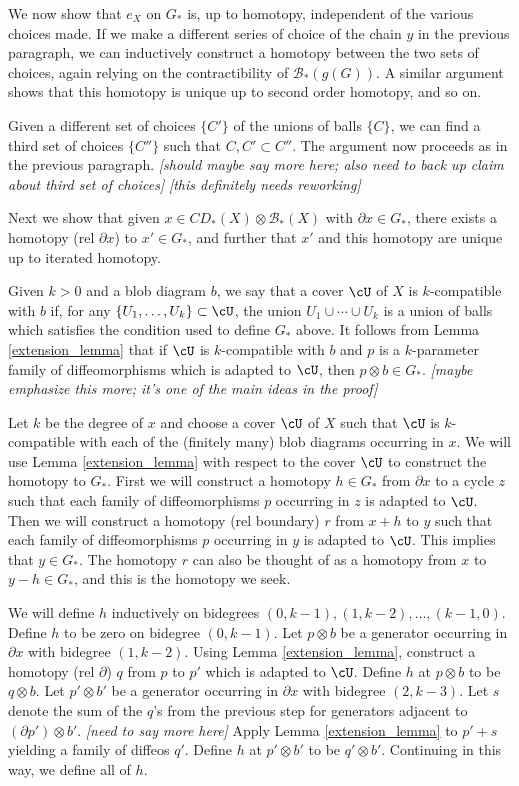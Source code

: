 \documentclass[11pt,leqno]{amsart}
\def\bc{{\mathcal B}}
\def\bd{\partial}
\def\sub{\subset}
\def\nn#1{{{\it \small [#1]}}}
\begin{document}
We now show that $e_X$ on $G_*$ is, up to homotopy, independent of the various choices made.
If we make a different series of choice of the chain $y$ in the previous paragraph,
we can inductively construct a homotopy between the two sets of choices,
again relying on the contractibility of $\bc_*(g(G))$.
A similar argument shows that this homotopy is unique up to second order homotopy, and so on.

Given a different set of choices $\{C'\}$ of the unions of balls $\{C\}$,
we can find a third set of choices $\{C''\}$ such that $C, C' \sub C''$.
The argument now proceeds as in the previous paragraph.
\nn{should maybe say more here; also need to back up claim about third set of choices}
\nn{this definitely needs reworking}

Next we show that given $x \in CD_*(X) \otimes \bc_*(X)$ with $\bd x \in G_*$, there exists
a homotopy (rel $\bd x$) to $x' \in G_*$, and further that $x'$ and
this homotopy are unique up to iterated homotopy.

Given $k>0$ and a blob diagram $b$, we say that a cover $\cU$ of $X$ is $k$-compatible with
$b$ if, for any $\{U_1, \ldots, U_k\} \sub \cU$, the union
$U_1\cup\cdots\cup U_k$ is a union of balls which satisfies the condition used to define $G_*$ above.
It follows from Lemma \ref{extension_lemma}
that if $\cU$ is $k$-compatible with $b$ and
$p$ is a $k$-parameter family of diffeomorphisms which is adapted to $\cU$, then
$p\otimes b \in G_*$.
\nn{maybe emphasize this more; it's one of the main ideas in the proof}

Let $k$ be the degree of $x$ and choose a cover $\cU$ of $X$ such that $\cU$ is
$k$-compatible with each of the (finitely many) blob diagrams occurring in $x$.
We will use Lemma \ref{extension_lemma} with respect to the cover $\cU$ to
construct the homotopy to $G_*$.
First we will construct a homotopy $h \in G_*$ from $\bd x$ to a cycle $z$ such that
each family of diffeomorphisms $p$ occurring in $z$ is adapted to $\cU$.
Then we will construct a homotopy (rel boundary) $r$ from $x + h$ to $y$ such that
each family of diffeomorphisms $p$ occurring in $y$ is adapted to $\cU$.
This implies that $y \in G_*$.
The homotopy $r$ can also be thought of as a homotopy from $x$ to $y-h \in G_*$, and this is the homotopy we seek.

We will define $h$ inductively on bidegrees $(0, k-1), (1, k-2), \ldots, (k-1, 0)$.
Define $h$ to be zero on bidegree $(0, k-1)$.
Let $p\otimes b$ be a generator occurring in $\bd x$ with bidegree $(1, k-2)$.
Using Lemma \ref{extension_lemma}, construct a homotopy (rel $\bd$) $q$ from $p$ to $p'$ which is adapted to $\cU$.
Define $h$ at $p\otimes b$ to be $q\otimes b$.
Let $p'\otimes b'$ be a generator occurring in $\bd x$ with bidegree $(2, k-3)$.
Let $s$ denote the sum of the $q$'s from the previous step for generators
adjacent to $(\bd p')\otimes b'$.
\nn{need to say more here}
Apply Lemma \ref{extension_lemma} to $p'+s$
yielding a family of diffeos $q'$.
Define $h$ at $p'\otimes b'$ to be $q'\otimes b'$.
Continuing in this way, we define all of $h$.
\end{document}
